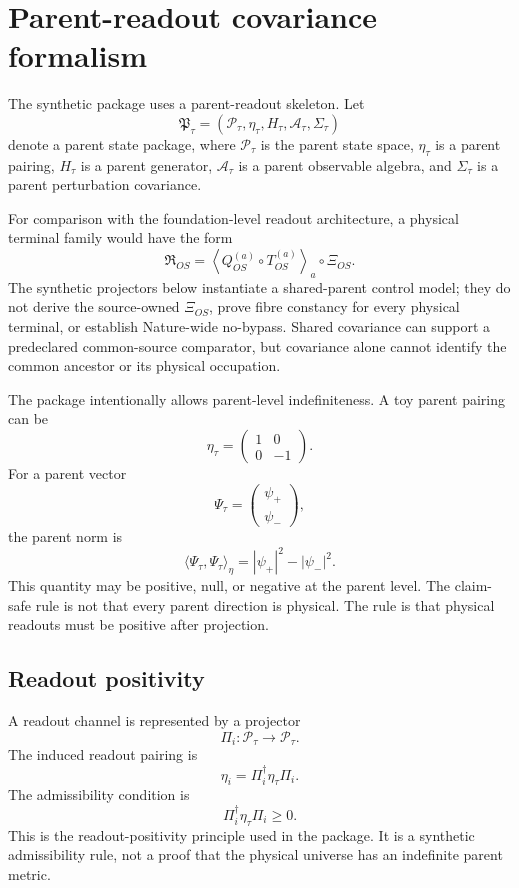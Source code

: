 \documentclass[12pt]{article}
\begin{document}
\section{Parent-readout covariance formalism}

The synthetic package uses a parent-readout skeleton.  Let
\[
  \mathfrak{P}_{\tau}
  =
  (\mathcal{P}_{\tau},\eta_{\tau},H_{\tau},
  \mathcal{A}_{\tau},\Sigma_{\tau})
\]
denote a parent state package, where \(\mathcal{P}_{\tau}\) is the parent state
space, \(\eta_{\tau}\) is a parent pairing, \(H_{\tau}\) is a parent generator,
\(\mathcal{A}_{\tau}\) is a parent observable algebra, and
\(\Sigma_{\tau}\) is a parent perturbation covariance.

For comparison with the foundation-level readout architecture, a physical
terminal family would have the form
\[
 \mathfrak R_{OS}
 =
 \left\langle Q_{OS}^{(a)}\circ T_{OS}^{(a)}\right\rangle_a
 \circ\Xi_{OS}.
\]
The synthetic projectors below instantiate a shared-parent control model; they
do not derive the source-owned \(\Xi_{OS}\), prove fibre constancy for every
physical terminal, or establish Nature-wide no-bypass.  Shared covariance can
support a predeclared common-source comparator, but covariance alone cannot
identify the common ancestor or its physical occupation.

The package intentionally allows parent-level indefiniteness.  A toy parent
pairing can be
\[
  \eta_{\tau}=
  \begin{pmatrix}
  1&0\\
  0&-1
  \end{pmatrix}.
\]
For a parent vector
\[
  \Psi_{\tau}=
  \begin{pmatrix}
  \psi_{+}\\
  \psi_{-}
  \end{pmatrix},
\]
the parent norm is
\[
  \langle \Psi_{\tau},\Psi_{\tau}\rangle_{\eta}
  =
  |\psi_{+}|^2-|\psi_{-}|^2.
\]
This quantity may be positive, null, or negative at the parent level.  The
claim-safe rule is not that every parent direction is physical.  The rule is
that physical readouts must be positive after projection.

\subsection{Readout positivity}

A readout channel is represented by a projector
\[
  \Pi_i:\mathcal{P}_{\tau}\to\mathcal{P}_{\tau}.
\]
The induced readout pairing is
\[
  \eta_i=\Pi_i^{\dagger}\eta_{\tau}\Pi_i.
\]
The admissibility condition is
\[
  \boxed{\Pi_i^{\dagger}\eta_{\tau}\Pi_i\geq0.}
  \label{eq:readout-positivity}
\]
This is the readout-positivity principle used in the package.  It is a
synthetic admissibility rule, not a proof that the physical universe has an
indefinite parent metric.
\end{document}
